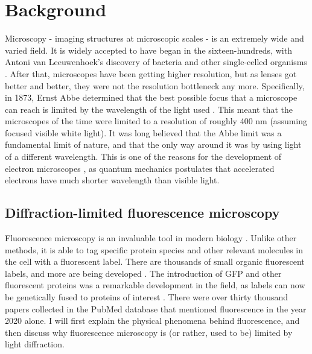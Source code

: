\chapter{Background}


Microscopy - imaging structures at microscopic scales - is an extremely wide and varied field. It is widely accepted to have began in the sixteen-hundreds, with Antoni van Leeuwenhoek's discovery of bacteria and other single-celled organisms . After that, microscopes have been getting higher resolution, but as lenses got better and better, they were not the resolution bottleneck any more. Specifically, in 1873, Ernst Abbe determined that the best possible focus that a microscope can reach is limited by the wavelength of the light used . This meant that the microscopes of the time were limited to a resolution of roughly 400 nm (assuming focused visible white light). It was long believed that the Abbe limit was a fundamental limit of nature, and that the only way around it was by using light of a different wavelength. This is one of the reasons for the development of electron microscopes , as quantum mechanics postulates that accelerated electrons have much shorter wavelength than visible light. 


\section{Diffraction-limited fluorescence microscopy}

Fluorescence microscopy is an invaluable tool in modern biology \cite{Danial2016}. Unlike other methods, it is able to tag specific protein species and other relevant molecules in the cell with a fluorescent label. There are thousands of small organic fluorescent labels, and more are being developed \cite{Zhang2002, Resch-Genger2008}. The introduction of GFP and other fluorescent proteins was a remarkable development in the field, as labels can now be genetically fused to proteins of interest \cite{Shaner2005, Matlashov2020}. There were over thirty thousand papers collected in the PubMed database that mentioned fluorescence in the year 2020 alone. I will first explain the physical phenomena behind fluorescence, and then discuss why fluorescence microscopy is (or rather, used to be) limited by light diffraction.

